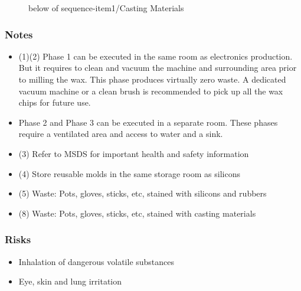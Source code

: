 \documentclass[a4paper,12pt,titlepage]{article}
\begin{document}
\begin{figure}[h]

\centering
{}
{below of sequence-item1/{Casting Materials}}
\vspace{1cm}
\end{figure}

\subsubsection*{Notes}
\begin{itemize}
\item (1)(2) Phase 1 can be executed in the same room as electronics production. But it requires to clean and vacuum the machine and surrounding area prior to milling the wax. This phase produces virtually zero waste. A dedicated vacuum machine or a clean brush is recommended to pick up all the wax chips for future use.
\item Phase 2 and Phase 3 can be executed in a separate room. These phases require a ventilated area and access to water and a sink.
\item (3) Refer to MSDS for important health and safety information
\item (4) Store reusable molds in the same storage room as silicons
\item (5) Waste: Pots, gloves, sticks, etc, stained with silicons and rubbers
\item (8) Waste: Pots, gloves, sticks, etc, stained with casting materials
\end{itemize}
\subsubsection*{Risks}
\begin{itemize}
\item Inhalation of dangerous volatile substances
\item Eye, skin and lung irritation
\end{itemize}
\end{document}
